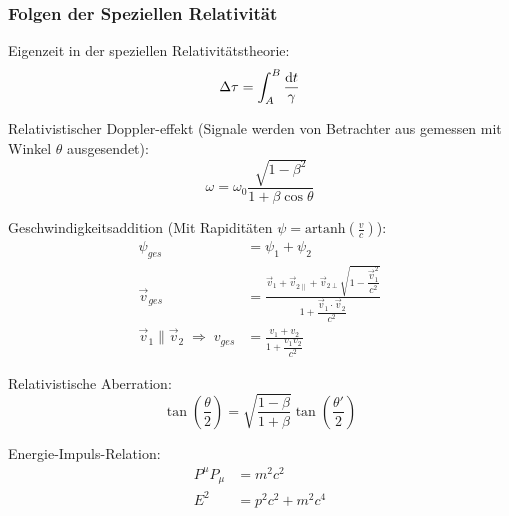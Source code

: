 		\subsubsection{Folgen der Speziellen Relativität}
			\noindent
			Eigenzeit in der speziellen Relativitätstheorie:
			\begin{equation}
				\Delta\tau = \int_A^B \frac{\mathrm{d} t}{\gamma}
			\end{equation}

			\noindent
			Relativistischer Doppler-effekt (Signale werden von Betrachter aus gemessen mit Winkel $\theta$ ausgesendet):
			\begin{equation}
				\omega = \omega_0\frac{\sqrt{1-\beta^2}}{1+\beta\cos\theta}
			\end{equation}

			\noindent
			Geschwindigkeitsaddition (Mit Rapiditäten $\psi = \mathrm{artanh}\left(\frac{v}{c}\right)$):
			\begin{equation}
				\begin{aligned}
					\psi_{ges} &= \psi_1+\psi_2 \\
					\vec{v}_{ges} &= \frac{\vec{v}_1+\vec{v}_{2\parallel}+\vec{v}_{2\perp}\sqrt{1-\dfrac{\vec{v}_1^2}{c^2}}}{1+\dfrac{\vec{v}_1\cdot\vec{v}_2}{c^2}} \\
					\vec{v}_1\parallel\vec{v}_2 \;\Rightarrow\; v_{ges} &= \frac{v_1+v_2}{1+\dfrac{v_1 v_2}{c^2}}
				\end{aligned}
			\end{equation}

			\noindent
			Relativistische Aberration:
			\begin{equation}
				\tan\left(\frac{\theta}{2}\right) = \sqrt{\frac{1-\beta}{1+\beta}}\tan\left(\frac{\theta'}{2}\right)
			\end{equation}

			\noindent
			Energie-Impuls-Relation:
			\begin{equation}
				\begin{aligned}
					P^\mu P_\mu &= m^2 c^2\\
					E^2 &= p^2 c^2 + m^2 c^4 \\
				\end{aligned}
			\end{equation}
			\newpage
